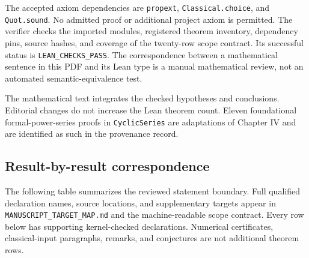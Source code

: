 \documentclass[11pt,letterpaper]{article}
\theoremstyle{plain}
\theoremstyle{plain}
\theoremstyle{plain}
\theoremstyle{definition}
\theoremstyle{definition}
\theoremstyle{definition}
\theoremstyle{definition}
\theoremstyle{remark}
\theoremstyle{remark}
\theoremstyle{remark}
\theoremstyle{remark}
\begin{document}
The accepted axiom dependencies are \texttt{propext}, \texttt{Classical.choice}, and \texttt{Quot.sound}. No admitted proof or additional project axiom is permitted. The verifier checks the imported modules, registered theorem inventory, dependency pins, source hashes, and coverage of the twenty-row scope contract. Its successful status is \texttt{LEAN\_CHECKS\_PASS}. The correspondence between a mathematical sentence in this PDF and its Lean type is a manual mathematical review, not an automated semantic-equivalence test.

The mathematical text integrates the checked hypotheses and conclusions. Editorial changes do not increase the Lean theorem count. Eleven foundational formal-power-series proofs in \texttt{CyclicSeries} are adaptations of Chapter IV and are identified as such in the provenance record.

\subsection{Result-by-result correspondence}

The following table summarizes the reviewed statement boundary. Full qualified declaration names, source locations, and supplementary targets appear in \texttt{MANUSCRIPT\_TARGET\_MAP.md} and the machine-readable scope contract. Every row below has supporting kernel-checked declarations. Numerical certificates, classical-input paragraphs, remarks, and conjectures are not additional theorem rows.
\end{document}
